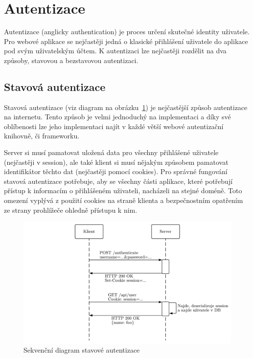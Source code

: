 
\section{Autentizace}\label{sec:autentizace}

Autentizace (anglicky authentication) je proces určení skutečné identity uživatele.
Pro webové aplikace se nejčastěji jedná o klasické přihlášení uživatele do aplikace pod svým uživatelským účtem.
K autentizaci lze nejčastěji rozdělit na dva způsoby, stavovou a bezstavovou autentizaci.

\subsection{Stavová autentizace}\label{subsec:stavováAutentizace}
Stavová autentizace (viz diagram na obrázku~\ref{fig:statefullAuthentication}) je nejčastější způsob autentizace na internetu.
Tento způsob je velmi jednoduchý na implementaci a díky své oblíbenosti lze jeho implementaci najít v každé větší webové autentizační knihovně, či frameworku.

Server si musí pamatovat uložená data pro všechny přihlášené uživatele (nejčastěji v session), ale také klient si musí nějakým způsobem pamatovat identifikátor těchto dat (nejčastěji pomocí cookies).
Pro správné fungování stavová autentizace potřebuje, aby se všechny části aplikace, které potřebují přístup k informacím o přihlášeném uživateli, nacházeli na stejné doméně.
Toto omezení vyplývá z použití cookies na straně klienta a bezpečnostním opatřením ze strany prohlížeče ohledně přístupu k nim.

\begin{figure}[ht!]
    \centering
    \includegraphics[width=\textwidth]{partials/navrh/statefullAuthentication.pdf}
    \caption{Sekvenční diagram stavové autentizace}\label{fig:statefullAuthentication}
\end{figure}

